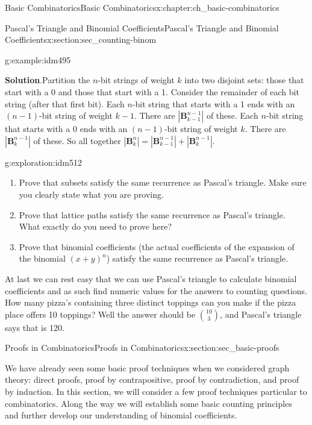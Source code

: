\documentclass[oneside,10pt,]{book}
\numberwithin{equation}{chapter}
\def\B{\mathbf{B}}
\begin{document}
\begin{chapterptx}{Basic Combinatorics}{}{Basic Combinatorics}{}{}{x:chapter:ch_basic-combinatorics}
\begin{sectionptx}{Pascal's Triangle and Binomial Coefficients}{}{Pascal's Triangle and Binomial Coefficients}{}{}{x:section:sec_counting-binom}
\begin{example}{}{g:example:idm495}
\par\smallskip%
\noindent\textbf{Solution}.\hypertarget{g:solution:idm499}{}\quad{}Partition the \(n\)-bit strings of weight \(k\) into two disjoint sets: those that start with a 0 and those that start with a 1.  Consider the remainder of each bit string (after that first bit). Each \(n\)-bit string that starts with a 1 ends with an \((n-1)\)-bit string of weight \(k-1\).  There are \(|\B^{n-1}_{k-1}|\) of these. Each \(n\)-bit string that starts with a 0 ends with an \((n-1)\)-bit string of weight \(k\).  There are \(|\B^{n-1}_k|\) of these.  So all together \(|\B^n_k| = |\B^{n-1}_{k-1}| + |\B^{n-1}_k|\).%
\end{example}
\begin{exploration}{}{g:exploration:idm512}%
\begin{enumerate}[font=\bfseries,label=(\alph*),ref=\alph*]
\item{}Prove that subsets satisfy the same recurrence as Pascal's triangle. Make sure you clearly state what you are proving.%
\item{}Prove that lattice paths satisfy the same recurrence as Pascal's triangle.  What exactly do you need to prove here?%
\item{}Prove that binomial coefficients (the actual coefficients of the expansion of the binomial \((x+y)^n\)) satisfy the same recurrence as Pascal's triangle.%
\end{enumerate}
\end{exploration}
At last we can rest easy that we can use Pascal's triangle to calculate binomial coefficients and as such find numeric values for the answers to counting questions. How many pizza's containing three distinct toppings can you make if the pizza place offers 10 toppings?  Well the answer should be \(\binom{10}{3}\), and Pascal's triangle says that is 120.%
\end{sectionptx}
%
%
\typeout{************************************************}
\typeout{************************************************}
%
\begin{sectionptx}{Proofs in Combinatorics}{}{Proofs in Combinatorics}{}{}{x:section:sec_basic-proofs}
\begin{introduction}{}%
We have already seen some basic proof techniques when we considered graph theory: direct proofs, proof by contrapositive, proof by contradiction, and proof by induction.  In this section, we will consider a few proof techniques particular to combinatorics.  Along the way we will establish some basic counting principles and further develop our understanding of binomial coefficients.%

\end{introduction}
\end{sectionptx}
\end{chapterptx}
\end{document}
